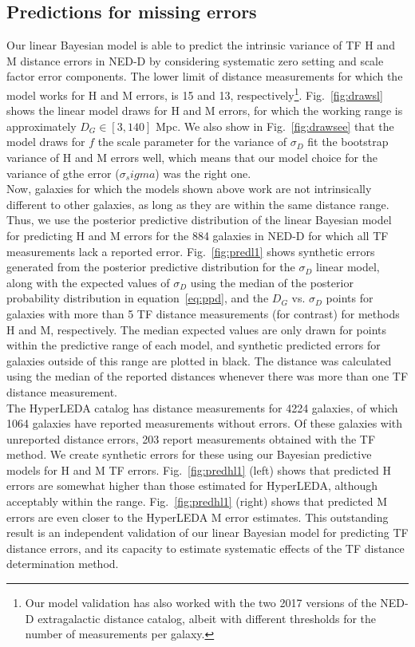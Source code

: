 \documentclass[a4paper,fleqn,usenatbib]{mnras}
\begin{document}
\subsection{Predictions for missing errors}
\label{sec:pred} 
Our linear Bayesian model is able to predict the intrinsic variance of TF H and M distance errors in NED-D by considering systematic zero setting and scale factor error components. The lower limit of distance measurements for which the model works for H and M errors, is 15 and 13, respectively\footnote{Our model validation has also worked with the two 2017 versions of the NED-D extragalactic distance catalog, albeit with different thresholds for the number of measurements per galaxy.}. Fig.~\ref{fig:drawsl} shows the linear model draws for H and M errors, for which the working range is approximately $D_G\in[3,140]$ Mpc. We also show in Fig.~\ref{fig:drawsee} that the model draws for $f$ the scale parameter for the variance of $\sigma_D$ fit the bootstrap variance of H and M errors well, which means that our model choice for the variance of gthe error ($\sigma_sigma$) was the right one. \\

Now, galaxies for which the models shown above work are not intrinsically different to other galaxies, as long as they are within the same distance range. Thus, we use the posterior predictive distribution of the linear Bayesian model for predicting H and M errors for the 884 galaxies in NED-D for which all TF measurements lack a reported error. Fig.~\ref{fig:predl1} shows synthetic errors generated from the posterior predictive distribution for the $\sigma_D$ linear model, along with the expected values of $\sigma_D$ using the median of the posterior probability distribution in equation~\ref{eq:ppd}, and the $D_G$ vs. $\sigma_D$ points for galaxies with more than 5 TF distance measurements (for contrast) for methods H and M, respectively. The median expected values are only drawn for points within the predictive range of each model, and synthetic predicted errors for galaxies outside of this range are plotted in black. The distance was calculated using the median of the reported distances whenever there was more than one TF distance measurement.\\

The HyperLEDA catalog has distance measurements for 4224 galaxies, of which 1064 galaxies have reported measurements without errors. Of these galaxies with unreported distance errors, 203 report measurements obtained with the TF method. We create synthetic errors for these using our Bayesian predictive models for H and M TF errors. Fig.~\ref{fig:predhl1} (left) shows that predicted H errors are somewhat higher than those estimated for HyperLEDA, although acceptably within the range. Fig.~\ref{fig:predhl1} (right) shows that predicted M errors are even closer to the HyperLEDA M error estimates. This outstanding result is an independent validation of our linear Bayesian model for predicting TF distance errors, and its capacity to estimate systematic effects of the TF distance determination method.\\
\end{document}
